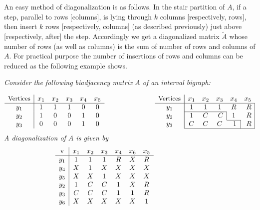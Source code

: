 \documentclass[secthm]{elsart}
\begin{document}
An easy method of diagonalization is as follows. In the stair partition of $A$, if a step, parallel to rows [columns], is lying through $k$ columns [respectively, rows], then insert $k$ rows [respectively, columns] (as described previously) just above [respectively, after] the step. Accordingly we get a diagonalized matrix $\tilde{A}$ whose number of rows (as well as columns) is the sum of number of rows and columns of $A$. For practical purpose the number of insertions of rows and columns can be reduced as the following example shows.

\begin{exmp}\label{exmp:diag}
{\em Consider the following biadjacency matrix $A$ of an interval bigraph:}

\vspace{-1.5em}
$$\begin{array}{c|ccccc}
\textrm{\small Vertices} & x_1 & x_2 & x_3 & x_4 & x_5\\
\hline
y_1 & 1 & 1 & 1 & 0 & 0 \\
y_2 & 1 & 0 & 0 & 1 & 0 \\
y_3 & 0 & 0 & 0 & 1 & 0
\end{array}\hspace{1in} \begin{array}{c|ccccc}
\textrm{\small Vertices} & x_1 & x_2 & x_3 & x_4 & x_5\\
\hline
y_1 & 1 & 1 & 1 & R & \multicolumn{1}{c@{\,\vline}}{R}\\
\cline{2-4}
y_2 & 1 & C & \multicolumn{1}{c@{\,\vline}}{C} & 1 & \multicolumn{1}{c@{\,\vline}}{R}\\
\cline{5-5}
y_3 & C & C & C & \multicolumn{1}{c@{\,\vline}}{1} & \multicolumn{1}{c@{\,\vline}}{R}\\
\cline{2-6}
\end{array}$$
{\em A diagonalization of $A$ is given by} 
$$\begin{array}{c|cccccc}
\textrm{\small v} & x_1 & x_2 & x_3 & x_4 & x_6 & x_5\\
\hline
y_1 & 1 & 1 & 1 & R & X & R \\
y_4 & X & 1 & X & X & X & X \\
y_5 & X & X & 1 & X & X & X \\
y_2 & 1 & C & C & 1 & X & R \\
y_3 & C & C & C & 1 & 1 & R \\
y_6 & X & X & X & X & X & 1
\end{array}\hspace{1in}
\begin{array}{c|cccccc}

\end{array}$$
\end{exmp}
\end{document}
